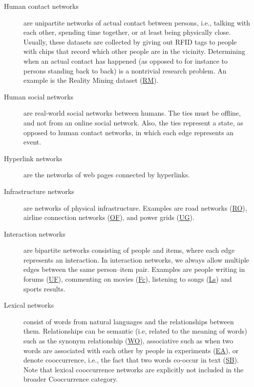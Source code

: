 \documentclass{article}
\begin{document}
\begin{description}
\item[Human contact networks] are unipartite networks of actual contact
  between persons, i.e., talking with each other, spending time
  together, or at least being physically close.  Usually, these datasets
  are collected by giving out RFID tags to people with chips that record
  which other people are in the vicinity.  Determining when an actual
  contact has happened (as opposed to for instance to persons standing
  back to back) is a nontrivial research problem. 
  An example is the Reality Mining dataset
  (\href{http://konect.uni-koblenz.de/networks/mit}{\textsf{RM}}). 

\item[Human social networks] are real-world social networks between
  humans.  
  The ties must be offline, and not from an online social network.
  Also, the ties represent a state, as opposed to human contact
  networks, in which each edge represents an event. 

\item[Hyperlink networks] are the networks of web pages connected by
  hyperlinks.  

\item[Infrastructure networks] are networks of physical infrastructure.  
  Examples are road networks
  (\href{http://konect.uni-koblenz.de/networks/roadNet-CA}{RO}), airline
  connection networks
  (\href{http://konect.uni-koblenz.de/networks/opsahl-openflights}{OF}), 
  and power grids
  (\href{http://konect.uni-koblenz.de/networks/opsahl-powergrid}{UG}).  
  
\item[Interaction networks] are bipartite networks consisting of people
  and items, where each edge represents an interaction. 
  In interaction networks, we always allow multiple edges between the
  same person--item pair.
  Examples are
  people writing in forums
  (\href{http://konect.uni-koblenz.de/networks/opsahl-ucforum}{\textsf{UF}}),
  commenting on movies
  (\href{http://konect.uni-koblenz.de/networks/filmtipset_comment}{\textsf{Fc}}),
  listening to songs
  (\href{http://konect.uni-koblenz.de/networks/lastfm_song}{\textsf{Ls}})
  and sports results. 

\item[Lexical networks] consist of words from natural 
  languages and the
  relationships between them. 
  Relationships can be semantic (i.e, related to the
  meaning of words) such as the
  synonym
    relationship (\href{http://konect.uni-koblenz.de/networks/wordnet-words}{\textsf{WO}}), associative such
  as when two words are associated with each other by people in
  experiments (\href{http://konect.uni-koblenz.de/networks/eat}{\textsf{EA}}), or denote 
  cooccurrence, i.e., the fact that two words co-occur in text (\href{http://konect.uni-koblenz.de/networks/lasagne-spanishbook}{\textsf{SB}}).  Note
  that lexical cooccurrence networks are explicitly not included in the
  broader Cooccurrence category. 


\end{description}
\end{document}
